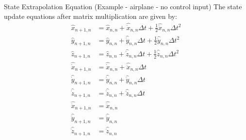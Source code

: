 \begin{frame}{State Extrapolation Equation (Example - airplane - no control input)}
The state update equations after matrix multiplication are given by:
\begin{align*}
\hat{x}_{n+1,n} &= \hat{x}_{n,n} + \hat{\dot{x}}_{n,n}\Delta t + \frac{1}{2}\hat{\ddot{x}}_{n,n}\Delta t^2 \\
\hat{y}_{n+1,n} &= \hat{y}_{n,n} + \hat{\dot{y}}_{n,n}\Delta t + \frac{1}{2}\hat{\ddot{y}}_{n,n}\Delta t^2 \\
\hat{z}_{n+1,n} &= \hat{z}_{n,n} + \hat{\dot{z}}_{n,n}\Delta t + \frac{1}{2}\hat{\ddot{z}}_{n,n}\Delta t^2 \\
\hat{\dot{x}}_{n+1,n} &= \hat{\dot{x}}_{n,n} + \hat{\ddot{x}}_{n,n}\Delta t \\
\hat{\dot{y}}_{n+1,n} &= \hat{\dot{y}}_{n,n} + \hat{\ddot{y}}_{n,n}\Delta t \\
\hat{\dot{z}}_{n+1,n} &= \hat{\dot{z}}_{n,n} + \hat{\ddot{z}}_{n,n}\Delta t \\
\hat{\ddot{x}}_{n+1,n} &= \hat{\ddot{x}}_{n,n} \\
\hat{\ddot{y}}_{n+1,n} &= \hat{\ddot{y}}_{n,n} \\
\hat{\ddot{z}}_{n+1,n} &= \hat{\ddot{z}}_{n,n}
\end{align*}
\end{frame}

